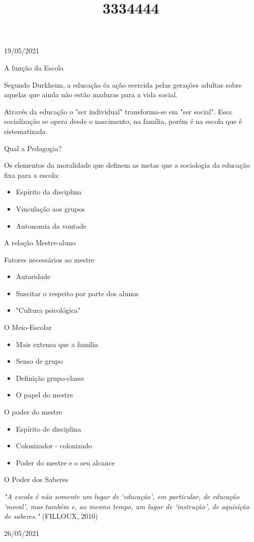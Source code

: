\documentclass{SchoolBook}
\begin{document}
    \begin{day}{19/05/2021}
        \title{3}{A função da Escola}
        
        Segundo Durkheim, a educação éa ação ecercida pelas gerações adultas sobre aquelas que ainda não estão maduras para a vida social.
        
        Através da educação o "ser individual" transforma-se em "ser social". Essa socialização se opera desde o nascimento, na família, porém é na escola que é sistematizada.
        
        \title{3}{Qual a Pedagogia?}
        
        Os elementos da moralidade que definem as metas que a sociologia da educação fixa para a escola:
        
        \begin{itemize}[nosep]
            \item Espírito da disciplina
            \item Vinculação aos grupos
            \item Autonomia da vontade
        \end{itemize}
        
        \title{3}{A relação Mestre-aluno}
        \title{4}{Fatores necessários ao mestre}
        
        \begin{itemize}[nosep]
            \item Autoridade
            \item Suscitar o respeito por parte dos alunos
            \item "Cultura psicológica"
        \end{itemize}
        
        \title{4}{O Meio-Escolar}
        
        \begin{itemize}[nosep]
            \item Mais extensa que a família
            \item Senso de grupo
            \item Definição grupo-classe
            \item O papel do mestre
        \end{itemize}
        
        \title{4}{O poder do mestre}
        
        \begin{itemize}[nosep]
            \item Espírito de disciplina
            \item Colonizador - colonizado
            \item Poder do mestre e o seu alcance
        \end{itemize}
        
        \title{4}{O Poder dos Saberes}
        
        \emph{"A escola é não somente um lugar de `educação', em particular, de educação `moral', mas também e, ao mesmo tempo, um lugar de `instrução', de aquisição de saberes."} (FILLOUX, 2010)
    \end{day}
    
    \begin{day}{26/05/2021}
        
    \end{day}
\end{document}
